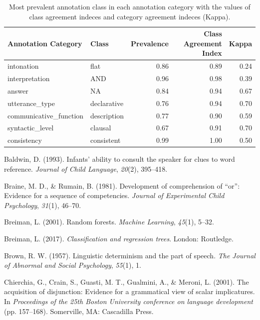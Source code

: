\documentclass[,man,floatsintext]{apa6}
\begin{document}
\begin{table}[t]

\caption{\label{tab:andAgreeStats}Most prevalent annotation class in each annotation category with the values of class agreement indeces and category agreement indeces (Kappa).}
\centering
\begin{tabular}{l|l|r|r|r}
\hline
Annotation Category & Class & Prevalence & Class Agreement Index & Kappa\\
\hline
intonation & flat & 0.86 & 0.89 & 0.24\\
\hline
interpretation & AND & 0.96 & 0.98 & 0.39\\
\hline
answer & NA & 0.84 & 0.94 & 0.67\\
\hline
utterance\_type & declarative & 0.76 & 0.94 & 0.70\\
\hline
communicative\_function & description & 0.77 & 0.90 & 0.59\\
\hline
syntactic\_level & clausal & 0.67 & 0.91 & 0.70\\
\hline
consistency & consistent & 0.99 & 1.00 & 0.50\\
\hline
\end{tabular}
\end{table}

\setlength{\parindent}{-0.5in}
\setlength{\leftskip}{0.5in}

\hypertarget{refs}{}
\leavevmode\hypertarget{ref-baldwin1993infants}{}%
Baldwin, D. (1993). Infants' ability to consult the speaker for clues to word reference. \emph{Journal of Child Language}, \emph{20}(2), 395--418.

\leavevmode\hypertarget{ref-braine1981development}{}%
Braine, M. D., \& Rumain, B. (1981). Development of comprehension of ``or'': Evidence for a sequence of competencies. \emph{Journal of Experimental Child Psychology}, \emph{31}(1), 46--70.

\leavevmode\hypertarget{ref-breiman2001random}{}%
Breiman, L. (2001). Random forests. \emph{Machine Learning}, \emph{45}(1), 5--32.

\leavevmode\hypertarget{ref-breiman2017classification}{}%
Breiman, L. (2017). \emph{Classification and regression trees}. London: Routledge.

\leavevmode\hypertarget{ref-brown1957linguistic}{}%
Brown, R. W. (1957). Linguistic determinism and the part of speech. \emph{The Journal of Abnormal and Social Psychology}, \emph{55}(1), 1.

\leavevmode\hypertarget{ref-chierchia2001acquisition}{}%
Chierchia, G., Crain, S., Guasti, M. T., Gualmini, A., \& Meroni, L. (2001). The acquisition of disjunction: Evidence for a grammatical view of scalar implicatures. In \emph{Proceedings of the 25th Boston University conference on language development} (pp. 157--168). Somerville, MA: Cascadilla Press.
\end{document}
